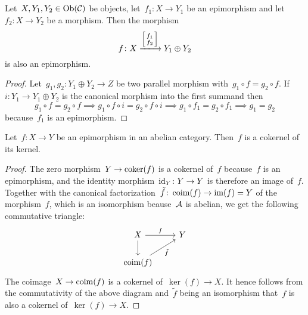 \section{}

\begin{lemma}
  \label{epi in component}
  Let~$X, Y_1, Y_2 \in \operatorname{Ob}(\mathcal{C})$ be objects, let~$f_1 \colon X \to Y_1$ be an epimorphism and let~$f_2 \colon X \to Y_2$ be a morphism.
  Then the morphism
  \[
      f
    \colon
      X
    \xlongto{\begin{bsmallmatrix} f_1 \\ f_2 \end{bsmallmatrix}}
      Y_1 \oplus Y_2
  \]
  is also an epimorphism.
\end{lemma}

\begin{proof}
  Let~$g_1, g_2 \colon Y_1 \oplus Y_2 \to Z$ be two parallel morphism with~$g_1 \circ f = g_2 \circ f$.
  If~$i \colon Y_1 \to Y_1 \oplus Y_2$ is the canonical morphism into the first summand then
  \[
              g_1 \circ f = g_2 \circ f
    \implies  g_1 \circ f \circ i = g_2 \circ f \circ i
    \implies  g_1 \circ f_1 = g_2 \circ f_1
    \implies  g_1 = g_2
  \]
  because~$f_1$ is an epimorphism.
\end{proof}

\begin{lemma}
  \label{epi is cokernel of kernel}
  Let~$f \colon X \to Y$ be an epimorphism in an abelian category.
  Then~$f$ is a cokernel of its kernel.
\end{lemma}

\begin{proof}
  The zero morphism~$Y \to \operatorname{coker}(f)$ is a cokernel of~$f$ because~$f$ is an epimorphism, and the identity morphism~$\operatorname{id}_Y \colon Y \to Y$ is therefore an image of~$f$.
  Together with the canonical factorization~$\tilde{f} \colon \operatorname{coim}(f) \to \operatorname{im}(f) = Y$ of the morphism~$f$, which is an isomorphism beause~$\mathcal{A}$ is abelian, we get the following commutative triangle: 
  \[
    \begin{tikzcd}
        X
        \arrow{r}[above]{f}
        \arrow{d}
      & Y
      \\
        \coim(f)
        \arrow{ur}[below right]{\tilde{f}}
      & {}
    \end{tikzcd}
  \]
  The coimage~$X \to \operatorname{coim}(f)$ is a cokernel of~$\ker(f) \to X$.
  It hence follows from the commutativity of the above diagram and~$\tilde{f}$ being an isomorphism that~$f$ is also a cokernel of~$\ker(f) \to X$.
\end{proof}

